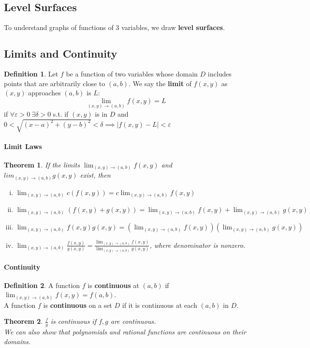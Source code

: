 \documentclass[12 pt]{article}
\newtheorem{thm}{Theorem}
\theoremstyle{definition}
\newtheorem{defn}{Definition}
\begin{document}
\subsection{Level Surfaces} To understand graphs of functions of $3$ variables, we draw \textbf{level surfaces}.
\subsection{Limits and Continuity}
\begin{defn}
	Let $f$ be a function of two variables whose domain $D$ includes points that are arbitrarily close to $(a,b)$. We say the \textbf{limit} of $f(x,y)$ as $(x,y)$ approaches $(a,b)$ is $L$: 
	$$\lim_{(x,y)\to (a,b)}f(x,y)=L$$
	if $\forall \varepsilon>0 \ \exists \delta>0$ s.t. if $(x,y)$ is in $D$ and $0<\sqrt{(x-a)^2+(y-b)^2}<\delta \implies |f(x,y)-L|<\varepsilon$
\end{defn}
\paragraph{Limit Laws}
\begin{thm}
	If the limits $\lim_{(x,y)\to(a,b)}f(x,y)$ and $lim_{(x,y)\to(a,b)}g(x,y)$ exist, then
	\begin{enumerate}[i)]
		\item $\lim_{(x,y)\to (a,b)}c (f(x,y))=c \lim_{(x,y)\to (a,b)}f(x,y)$
		\item $\lim_{(x,y)\to (a,b)}(f(x,y)+g(x,y))=\lim_{(x,y)\to (a,b)}f(x,y)+\lim_{(x,y)\to(a,b)}g(x,y)$
		\item $\lim_{(x,y)\to (a,b)}f(x,y)g(x,y)=(\lim_{(x,y)\to(a,b)}f(x,y))(\lim_{(x,y)\to(a,b)}g(x,y))$
		\item $\lim_{(x,y)\to(a,b)} \frac{f(x,y)}{g(x,y)}=\frac{\lim_{(x,y)\to(a,b)}f(x,y)}{\lim_{(x,y)\to(a,b)}g(x,y)}$, where denominator is nonzero.
	\end{enumerate}
\end{thm}
\paragraph{Continuity}
\begin{defn}
	A function $f$ is \textbf{continuous} at $(a,b)$ if $\lim_{(x,y)\to(a,b)}f(x,y)=f(a,b)$.
	\\ A function $f$ is \textbf{continuous} on a set $D$ if it is continuous at each $(a,b)$ in $D$.
\end{defn}
\begin{thm}
	$\frac{f}{g}$ is continuous if $f,g$ are continuous.
	\\ We can also show that polynomials and rational functions are continuous on their domains.
\end{thm}
\end{document}

